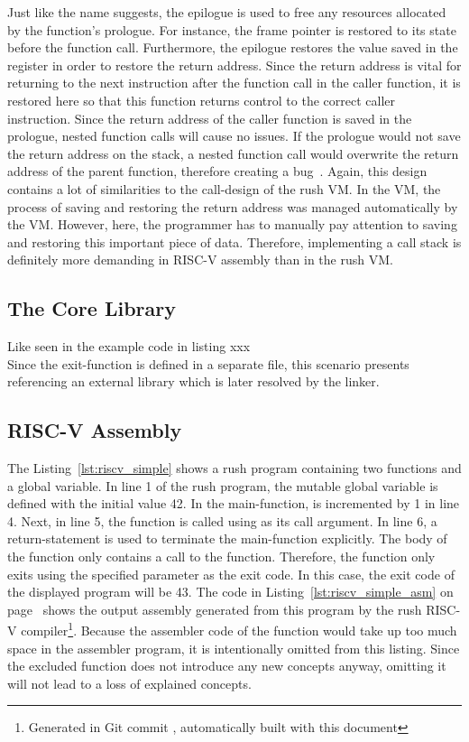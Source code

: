 Just like the name suggests, the epilogue is used to free any resources allocated by the function's prologue.
For instance, the frame pointer is restored to its state before the function call.
Furthermore, the epilogue restores the value saved in the  register in order to restore the return address.
Since the return address is vital for returning to the next instruction after the function call in the caller function, it is restored here so that this function returns control to the correct caller instruction.
Since the return address of the caller function is saved in the prologue, nested function calls will cause no issues.
If the prologue would not save the return address on the stack, a nested function call would overwrite the return address of the parent function, therefore creating a bug~\cite[p.33]{Patterson2017}.
Again, this design contains a lot of similarities to the call-design of the rush VM\@.
In the VM, the process of saving and restoring the return address was managed automatically by the VM\@.
However, here, the programmer has to manually pay attention to saving and restoring this important piece of data.
Therefore, implementing a call stack is definitely more demanding in RISC-V assembly than in the rush VM\@.

\subsection{The Core Library}

Like seen in the example code in listing xxx\\
Since the exit-function is defined in a separate file, this scenario presents referencing an external library which is later resolved by the linker.

\subsection{RISC-V Assembly}

The Listing~\ref{lst:riscv_simple} shows a rush program containing two functions and a global variable.
In line 1 of the rush program, the mutable global variable  is defined with the initial value 42.
In the main-function,  is incremented by 1 in line 4.
Next, in line 5, the  function is called using  as its call argument.
In line 6, a return-statement is used to terminate the main-function explicitly.
The body of the  function only contains a call to the  function.
Therefore, the  function only exits using the specified parameter  as the exit code.
In this case, the exit code of the displayed program will be 43.
The code in Listing~\ref{lst:riscv_simple_asm} on page~\pageref{lst:riscv_simple_asm} shows the output assembly generated from this program by the rush RISC-V compiler\footnote{Generated in Git commit \rushCommit, automatically built with this document}.
Because the assembler code of the  function would take up too much space in the assembler program, it is intentionally omitted from this listing.
Since the excluded function does not introduce any new concepts anyway, omitting it will not lead to a loss of explained concepts.

